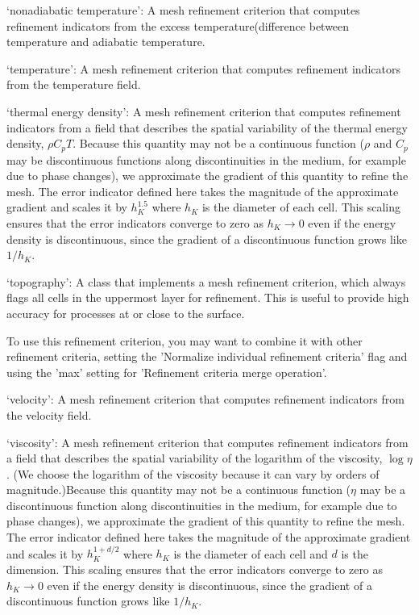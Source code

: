 \begin{itemize}
`nonadiabatic temperature': A mesh refinement criterion that computes refinement indicators from the excess temperature(difference between temperature and adiabatic temperature.

`temperature': A mesh refinement criterion that computes refinement indicators from the temperature field.

`thermal energy density': A mesh refinement criterion that computes refinement indicators from a field that describes the spatial variability of the thermal energy density, $\rho C_p T$. Because this quantity may not be a continuous function ($\rho$ and $C_p$ may be discontinuous functions along discontinuities in the medium, for example due to phase changes), we approximate the gradient of this quantity to refine the mesh. The error indicator defined here takes the magnitude of the approximate gradient and scales it by $h_K^{1.5}$ where $h_K$ is the diameter of each cell. This scaling ensures that the error indicators converge to zero as $h_K\rightarrow 0$ even if the energy density is discontinuous, since the gradient of a discontinuous function grows like $1/h_K$.

`topography': A class that implements a mesh refinement criterion, which always flags all cells in the uppermost layer for refinement. This is useful to provide high accuracy for processes at or close to the surface.

To use this refinement criterion, you may want to combine it with other refinement criteria, setting the 'Normalize individual refinement criteria' flag and using the 'max' setting for 'Refinement criteria merge operation'.

`velocity': A mesh refinement criterion that computes refinement indicators from the velocity field.

`viscosity': A mesh refinement criterion that computes refinement indicators from a field that describes the spatial variability of the logarithm of the viscosity, $\log\eta$. (We choose the logarithm of the viscosity because it can vary by orders of magnitude.)Because this quantity may not be a continuous function ($\eta$ may be a discontinuous function along discontinuities in the medium, for example due to phase changes), we approximate the gradient of this quantity to refine the mesh. The error indicator defined here takes the magnitude of the approximate gradient and scales it by $h_K^{1+d/2}$ where $h_K$ is the diameter of each cell and $d$ is the dimension. This scaling ensures that the error indicators converge to zero as $h_K\rightarrow 0$ even if the energy density is discontinuous, since the gradient of a discontinuous function grows like $1/h_K$.



\end{itemize}

